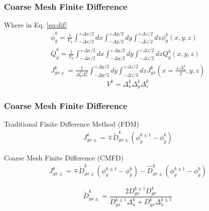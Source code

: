 \documentclass{beamer}
\begin{document}
\begin{frame}
\frametitle{Coarse Mesh Finite Difference}
\begin{block}{Where in Eq. \eqref{eq:dif}}
    \begin{equation}
      \begin{split}
      \overline \phi  _{g}^k = \frac{1}{{{V_k}}}\int_{ - \Delta x/2}^{ + \Delta x/2} {dx} \int_{ - \Delta y/2}^{ + \Delta y/2} {dy} \int_{ - \Delta z/2}^{ + \Delta z/2} {dz{^{}}} \phi _g^k(x,y,z) \\
      \overline Q _{g}^k = \frac{1}{{{V_k}}}\int_{ - \Delta x/2}^{ + \Delta x/2} {dx} \int_{ - \Delta y/2}^{ + \Delta y/2} {dy} \int_{ - \Delta z/2}^{ + \Delta z/2} {dz{^{}}} Q_g^k(x,y,z) \\
      J_{gx \pm }^k = \frac{1}{{\Delta _y^k\Delta _z^k}}\int_{ - \Delta y/2}^{ + \Delta y/2} {dy} \int_{ - \Delta z/2}^{ + \Delta z/2} {dz{^{}}} J_{gx}^k\left( {x = \frac{{ \pm \Delta _x^k}}{2},y,z} \right) \nonumber
     \end{split}
   \end{equation}
   \begin{equation}
   {V^k} = \Delta _x^k\Delta _y^k\Delta _z^k \nonumber
   \end{equation}
\end{block}

\end{frame}


\begin{frame}
\frametitle{Coarse Mesh Finite Difference}
\begin{block}{Traditional Finite Difference Method (FDM)}
    \begin{equation}
      \begin{split}
      J_{gx \pm }^k = \mp \widetilde{D}_{gx \pm }^k \left( \phi  _{g}^{k\pm1} - \phi  _{g}^k \right)
      \end{split}
    \end{equation}
\end{block}
\begin{block}{Coarse Mesh Finite Difference (CMFD)}
    \begin{equation}
      \begin{split}
      J_{gx \pm }^k = \mp \widetilde{D}_{gx \pm }^k \left( \phi  _{g}^{k\pm1} - \phi  _{g}^k \right) - \widehat{D}_{gx \pm }^k \left( \phi  _{g}^{k\pm1} - \phi  _{g}^k \right) \label{eq:upd}
      \end{split}
    \end{equation}
\end{block}
\begin{equation}
  \widetilde{D}_{gx \pm }^k = \frac{2 D_{gx}^{k\pm1} D_{gx}^{k}}{D_{gx}^{k\pm1}\Delta _x^k + D_{gx}^{k}\Delta _x^{k\pm1}}
\end{equation}
\end{frame}
\end{document}
